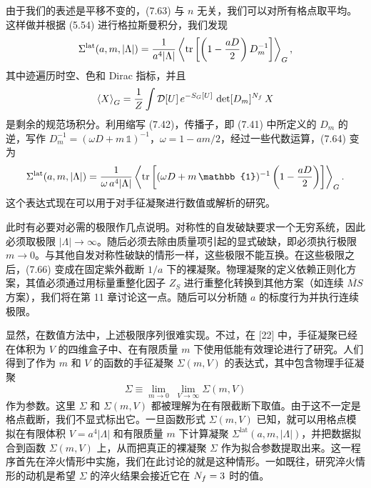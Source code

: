 由于我们的表述是平移不变的，(7.63) 与 $n$ 无关，我们可以对所有格点取平均。这样做并根据 (5.54) 进行格拉斯曼积分，我们发现
\begin{equation}
  \Sigma^{\mathrm{lat}}(a, m, |\Lambda|) =
  \frac{1}{a^4|\Lambda|}\left\langle
    \operatorname{tr}\left[\left(1-\frac{aD}{2}\right)D_m^{-1}\right]
  \right\rangle_G,
\end{equation}
其中迹遍历时空、色和 Dirac 指标，并且
\begin{equation}
  \left\langle X \right\rangle_G = \frac{1}{Z}\int \mathcal{D}[U]\,e^{-S_G[U]}\,\det[D_m]^{N_f}\,X
\end{equation}
是剩余的规范场积分。利用缩写 (7.42)，传播子，即 (7.41) 中所定义的 $D_m$ 的逆，写作 $D_m^{-1} = (\omega D + m\,\mathbb{1})^{-1}$，$\omega = 1 - am/2$，经过一些代数运算，(7.64) 变为
\begin{equation}
  \Sigma^{\mathrm{lat}}(a, m, |\Lambda|) =
  \frac{1}{\omega\, a^4|\Lambda|}\left\langle
    \tr\left[(\omega D + m\,\mathbb{1})^{-1}\left(1-\frac{aD}{2}\right)\right]
  \right\rangle_G .
\end{equation}
这个表达式现在可以用于对手征凝聚进行数值或解析的研究。

此时有必要对必需的极限作几点说明。对称性的自发破缺要求一个无穷系统，因此必须取极限 $|\Lambda| \to \infty$。随后必须去除由质量项引起的显式破缺，即必须执行极限 $m \to 0$。与其他自发对称性破缺的情形一样，这些极限不能互换。在这些极限之后，(7.66) 变成在固定紫外截断 $1/a$ 下的裸凝聚。物理凝聚的定义依赖正则化方案，其值必须通过用标量重整化因子 $Z_S$ 进行重整化转换到其他方案（如连续 $\overline{MS}$ 方案），我们将在第 11 章讨论这一点。随后可以分析随 $a$ 的标度行为并执行连续极限。

显然，在数值方法中，上述极限序列很难实现。不过，在 [22] 中，手征凝聚已经在体积为 $V$ 的四维盒子中、在有限质量 $m$ 下使用低能有效理论进行了研究。人们得到了作为 $m$ 和 $V$ 的函数的手征凝聚 $\Sigma(m, V)$ 的表达式，其中包含物理手征凝聚
\begin{equation}
  \Sigma \equiv \lim_{m \to 0}\;\lim_{V \to \infty} \Sigma(m, V)
\end{equation}
作为参数。这里 $\Sigma$ 和 $\Sigma(m, V)$ 都被理解为在有限截断下取值。由于这不一定是格点截断，我们不显式标出它。一旦函数形式 $\Sigma(m, V)$ 已知，就可以用格点模拟在有限体积 $V = a^4|\Lambda|$ 和有限质量 $m$ 下计算凝聚 $\Sigma^{\mathrm{lat}}(a, m, |\Lambda|)$，并把数据拟合到函数 $\Sigma(m, V)$ 上，从而把真正的裸凝聚 $\Sigma$ 作为拟合参数提取出来。这一程序首先在淬火情形中实施，我们在此讨论的就是这种情形。一如既往，研究淬火情形的动机是希望 $\Sigma$ 的淬火结果会接近它在 $N_f = 3$ 时的值。

